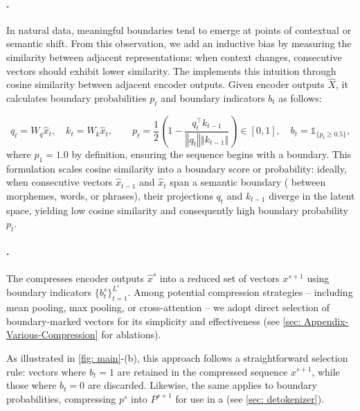 \paragraph{\ROUTER{}.}
In natural data, meaningful boundaries tend to emerge at points of contextual or semantic shift.
From this observation, we add an inductive bias by measuring the similarity between adjacent representations: when context changes, consecutive vectors should exhibit lower similarity.
The \router{} implements this intuition through cosine similarity between adjacent encoder outputs.
Given encoder outputs $\hat{X}$, it calculates boundary probabilities $p_t$ and boundary indicators $b_t$ as follows:

\begin{equation}
\label{eq: Rounting-Module}
q_t = W_q \hat{x}_t, \quad k_t = W_k \hat{x}_t, \qquad p_t = \frac{1}{2} \left(1 - \frac{q_t^\top k_{t-1}}{\left\Vert q_t \right\Vert \left\Vert k_{t-1} \right\Vert}\right) \in [0, 1], \quad b_t = \mathds{1}_{\{p_t \geq 0.5\}},
\end{equation}
where $p_1 = 1.0$ by definition, ensuring the sequence begins with a boundary.
This formulation scales cosine similarity into a boundary score or probability: ideally, when consecutive vectors $\hat{x}_{t-1}$ and $\hat{x}_t$ span a semantic boundary (\eg{} between morphemes, words, or phrases), their projections $q_t$ and $k_{t-1}$ diverge in the latent space, yielding low cosine similarity and consequently high boundary probability $p_t$.

\paragraph{\Downsampler{}.}
The \downsampler{} compresses encoder outputs $\hat{x}^s$ into a reduced set of vectors $x^{s+1}$ using boundary indicators $\{b_t^s\}_{t=1}^{L^s}$.
Among potential compression strategies -- including mean pooling, max pooling, or cross-attention -- we adopt direct selection of boundary-marked vectors for its simplicity and effectiveness (see \cref{sec: Appendix-Various-Compression} for ablations).

As illustrated in \cref{fig: main}-(b), this approach follows a straightforward selection rule: vectors where $b_t = 1$ are retained in the compressed sequence $x^{s+1}$, while those where $b_t = 0$ are discarded.
Likewise, the same \downsampler{} applies to boundary probabilities, compressing $p^s$ into $P^{s+1}$ for use in a \dechunk{} (see \cref{sec: detokenizer}).

